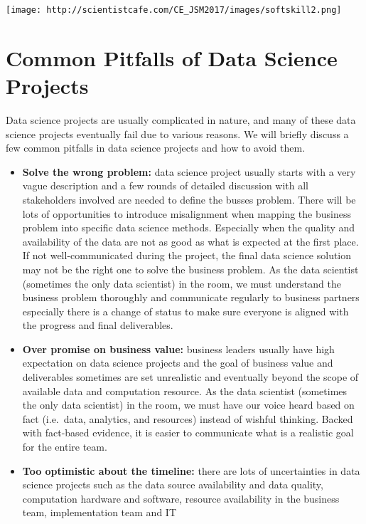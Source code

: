 \documentclass[]{book}
\theoremstyle{definition}
\theoremstyle{definition}
\theoremstyle{remark}
\begin{document}
\texttt{[image: http://scientistcafe.com/CE\_JSM2017/images/softskill2.png]}

\section{Common Pitfalls of Data Science
Projects}\label{common-pitfalls-of-data-science-projects}

Data science projects are usually complicated in nature, and many of
these data science projects eventually fail due to various reasons. We
will briefly discuss a few common pitfalls in data science projects and
how to avoid them.

\begin{itemize}
\item
  \textbf{Solve the wrong problem:} data science project usually starts
  with a very vague description and a few rounds of detailed discussion
  with all stakeholders involved are needed to define the busses
  problem. There will be lots of opportunities to introduce misalignment
  when mapping the business problem into specific data science methods.
  Especially when the quality and availability of the data are not as
  good as what is expected at the first place. If not well-communicated
  during the project, the final data science solution may not be the
  right one to solve the business problem. As the data scientist
  (sometimes the only data scientist) in the room, we must understand
  the business problem thoroughly and communicate regularly to business
  partners especially there is a change of status to make sure everyone
  is aligned with the progress and final deliverables.
\item
  \textbf{Over promise on business value:} business leaders usually have
  high expectation on data science projects and the goal of business
  value and deliverables sometimes are set unrealistic and eventually
  beyond the scope of available data and computation resource. As the
  data scientist (sometimes the only data scientist) in the room, we
  must have our voice heard based on fact (i.e.~data, analytics, and
  resources) instead of wishful thinking. Backed with fact-based
  evidence, it is easier to communicate what is a realistic goal for the
  entire team.
\item
  \textbf{Too optimistic about the timeline:} there are lots of
  uncertainties in data science projects such as the data source
  availability and data quality, computation hardware and software,
  resource availability in the business team, implementation team and IT

\end{itemize}
\end{document}
